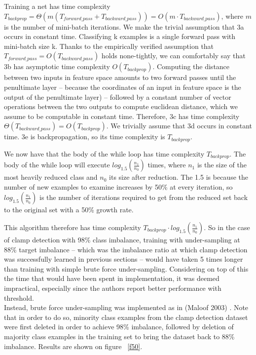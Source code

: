 \documentclass[a4paper,11pt]{article}
\begin{document}
Training a net has time complexity $T_{backprop} = \Theta(m (T_{forward\_pass}+T_{backward\_pass})) = O(m \cdot T_{backward\_pass})$, where $m$ is the number of mini-batch iterations. We make the trivial assumption that 3a occurs in constant time. Classifying k examples is a single forward pass with mini-batch size k. Thanks to the empirically verified \cite{soumith-benchmark} assumption that $T_{forward\_pass} = O(T_{backward\_pass})$ holds none-tightly, we can comfortably say that 3b has asymptotic time complexity $O(T_{backprop})$. Computing the distance between two inputs in feature space amounts to two forward passes until the penultimate layer -- because the coordinates of an input in feature space is the output of the penultimate layer) -- followed by a constant number of vector operations between the two outputs to compute euclidean distance, which we assume to be computable in constant time. Therefore, 3c has time complexity $\Theta(T_{backward\_pass}) = O(T_{backprop})$. We trivially assume that 3d occurs in constant time. 3e is backpropagation, so its time complexity is $T_{backprop}$.

We now have that the body of the while loop has time complexity $T_{backprop}$. The body of the while loop will execute $log_{1.5}(\frac{n_1}{n_0})$ times, where $n_1$ is the size of the most heavily reduced class and $n_0$ its size after reduction. The 1.5 is because the number of new examples to examine increases by 50\% at every iteration, so $log_{1.5}(\frac{n_1}{n_0})$ is the number of iterations required to get from the reduced set back to the original set with a 50\% growth rate.

This algorithm therefore has time complexity $T_{backprop}\cdot log_{1.5}(\frac{n_1}{n_0})$. So in the case of clamp detection with 98\% class imbalance, training with under-sampling at 88\% target imbalance -- which was the imbalance ratio at which clamp detection was successfully learned in previous sections -- would have taken 5 times longer than training with simple brute force under-sampling. Considering on top of this the time that would have been spent in implementation, it was deemed impractical, especially since the authors report better performance with threshold. \\

Instead, brute force under-sampling was implemented as in (Maloof 2003) \cite{maloof}. Note that in order to do so, minority class examples from the clamp detection dataset were first deleted in order to achieve 98\% imbalance, followed by deletion of majority class examples in the training set to bring the dataset back to 88\% imbalance. Results are shown on figure ~\ref{f50}.
\end{document}

